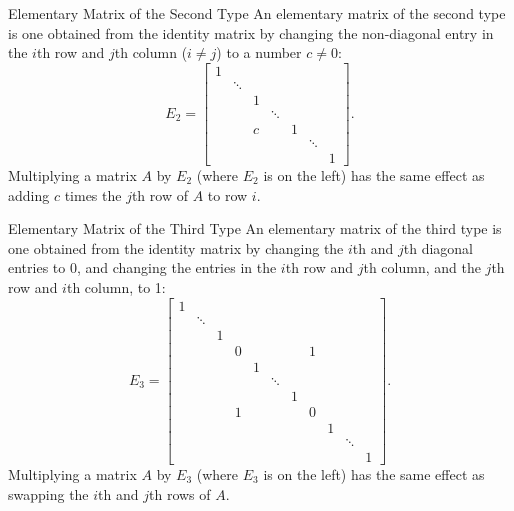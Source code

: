 \begin{edXshowhide}{Elementary Matrix of the Second Type}
An elementary matrix of the second type is one obtained from the identity matrix by changing the non-diagonal entry in the $i$th row and $j$th column ($i\ne j$) to a number $c \ne 0$: 
\[ E_2 = \left[ 
\begin{array}{ccccccc}
1 &  &  &  &  &  &  \\
 & \ddots &  &  &  &  &  \\
 &   & 1& &  &  &  \\
 &   &  &  \ddots &  &  &  \\
 &   &  c &  & 1 &  &  \\
 &   &  &  &  & \ddots  &  \\
 &   &  &  &  &   & 1 
\end{array}
\right].  \]
Multiplying  a matrix $A$ by $E_2$ (where $E_2$ is on the left) has the same effect as adding $c$ times the $j$th row of $A$ to row $i$.  
\end{edXshowhide}

\begin{edXshowhide}{Elementary Matrix of the Third Type}
An elementary matrix of the third type is one obtained from the identity matrix by changing the $i$th and $j$th diagonal entries to 0, and changing the entries in the $i$th row and $j$th column, and the $j$th row and $i$th column, to 1: 
\[ E_3 = \left[ 
\begin{array}{ccccccccccc}
1 &  &  &  &  &  &  & & & &\\
 & \ddots &  &  &  &  &  & & & &\\
 &   & 1& &  &  &  & & & & \\
 &   &  &  0 &  &  &  & 1 & & & \\
 &   &   &  & 1 &  &  & & & &\\
 &   &  &  &  & \ddots  & & & & & \\
 &   &  &  &  &   & 1 & & & & \\
&   &  &  1 &  &   &  & 0 & & &  \\ 
&   &  &  &  &   &  &  & 1 & & \\
&   &  &  &  &   &  &  &  & \ddots & \\ 
&   &  &  &  &   &  &  &  & & 1
 \end{array}
\right].  \]
Multiplying  a matrix $A$ by $E_3$ (where $E_3$ is on the left) has the same effect as swapping the $i$th and $j$th rows
of $A$.  
\end{edXshowhide}





